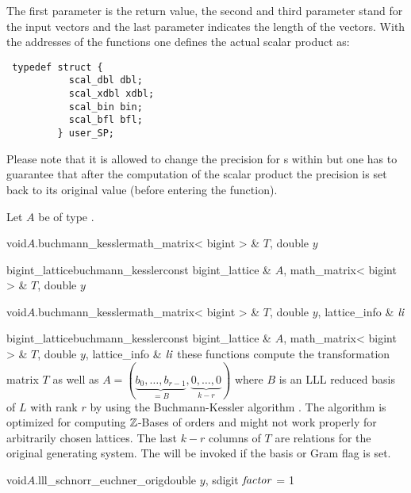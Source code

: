 The first parameter is the return value, the second and third parameter stand for the input
vectors and the last parameter indicates the length of the vectors.  With the addresses of the
functions one defines the actual scalar product as:
\begin{verbatim}
 typedef struct {
           scal_dbl dbl;
           scal_xdbl xdbl;
           scal_bin bin;
           scal_bfl bfl;
         } user_SP;
\end{verbatim}
Please note that it is allowed to change the precision for s within  but one has to guarantee that
after the computation of the scalar product the precision is set back to its original value
(before entering the function).

Let $A$ be of type .

\begin{fcode}{void}{$A$.buchmann_kessler}{math_matrix< bigint > & $T$, double $y$}
\end{fcode}

\begin{fcode}{bigint_lattice}{buchmann_kessler}{const bigint_lattice & $A$,
    math_matrix< bigint > & $T$, double $y$}%
\end{fcode}

\begin{fcode}{void}{$A$.buchmann_kessler}{math_matrix< bigint > & $T$, double $y$,
    lattice_info & $\mathit{li}$}%
\end{fcode}

\begin{fcode}{bigint_lattice}{buchmann_kessler}{const bigint_lattice & $A$,
    math_matrix< bigint > & $T$, double $y$, lattice_info & $\mathit{li}$}%
  these functions compute the transformation matrix $T$ as well as $A = (\underbrace{b_0, \dots,
    b_{r-1}}_{=B}, \underbrace{0, \dots, 0}_{k-r})$ where $B$ is an LLL reduced basis of $L$
  with rank $r$ by using the Buchmann-Kessler algorithm \cite{Buchmann/Kessler:1992}.  The
  algorithm is optimized for computing $\mathbb{Z}$-Bases of orders and might not work properly for
  arbitrarily chosen lattices.  The last $k-r$ columns of $T$ are relations for the original
  generating system.  The \LEH will be invoked if the basis or Gram flag is set.
\end{fcode}



\begin{fcode}{void}{$A$.lll_schnorr_euchner_orig}{double $y$, sdigit $\mathit{factor}$ = 1}
\end{fcode}

